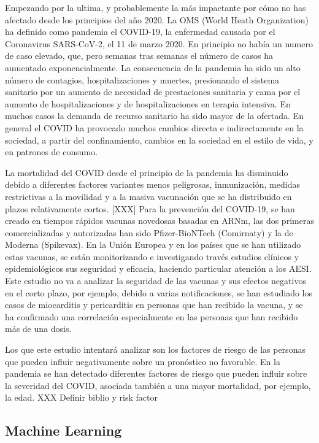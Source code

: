 \documentclass[
]{article}
\begin{document}
Empezando por la ultima, y probablemente la más impactante por cómo no
has afectado desde los principios del año 2020. La OMS (World Heath
Organization) ha definido como pandemia el COVID-19, la enfermedad
causada por el Coronavirus SARS-CoV-2, el 11 de marzo 2020. En principio
no había un numero de caso elevado, que, pero semanas tras semanas el
número de casos ha aumentado exponencialmente. La consecuencia de la
pandemia ha sido un alto número de contagios, hospitalizaciones y
muertes, presionando el sistema sanitario por un aumento de necesidad de
prestaciones sanitaria y cama por el aumento de hospitalizaciones y de
hospitalizaciones en terapia intensiva. En muchos casos la demanda de
recurso sanitario ha sido mayor de la ofertada. En general el COVID ha
provocado muchos cambios directa e indirectamente en la sociedad, a
partir del confinamiento, cambios en la sociedad en el estilo de vida, y
en patrones de consumo.

La mortalidad del COVID desde el principio de la pandemia ha disminuido
debido a diferentes factores variantes menos peligrosas, inmunización,
medidas restrictivas a la movilidad y a la masiva vacunación que se ha
distribuido en plazos relativamente cortos. {[}XXX{]} Para la prevención
del COVID-19, se han creado en tiempos rápidos vacunas novedosas basadas
en ARNm, las dos primeras comercializadas y autorizadas han sido
Pfizer-BioNTech (Comirnaty) y la de Moderna (Spikevax). En la Unión
Europea y en los países que se han utilizado estas vacunas, se están
monitorizando e investigando través estudios clínicos y epidemiológicos
sus seguridad y eficacia, haciendo particular atención a los AESI. Este
estudio no va a analizar la seguridad de las vacunas y sus efectos
negativos en el corto plazo, por ejemplo, debido a varias
notificaciones, se han estudiado los casos de miocarditis y pericarditis
en personas que han recibido la vacuna, y se ha confirmado una
correlación especialmente en las personas que han recibido más de una
dosis.

Los que este estudio intentará analizar son los factores de riesgo de
las personas que pueden influir negativamente sobre un pronóstico no
favorable. En la pandemia se han detectado diferentes factores de riesgo
que pueden influir sobre la severidad del COVID, asociada también a una
mayor mortalidad, por ejemplo, la edad. XXX Definir biblio y risk factor

\hypertarget{machine-learning}{%
\subsection{Machine Learning}\label{machine-learning}}
\end{document}
